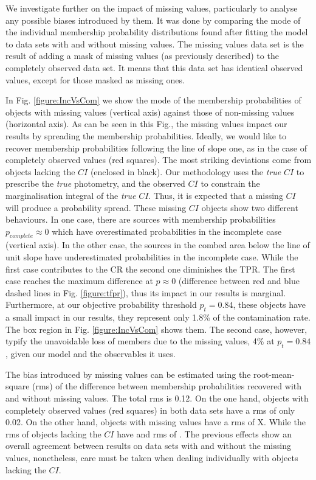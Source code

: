 We investigate further on the impact of missing values, particularly to analyse any possible biases introduced by them. It was done by comparing the mode of the individual membership probability distributions found after fitting the model to data sets with and without missing values. The missing values data set is the result of adding a mask of missing values (as previously described) to the completely observed data set. It means that this data set has identical observed values, except for those masked as missing ones. 

In Fig. \ref{figure:IncVsCom} we show the mode of the membership probabilities of objects with missing values (vertical axis) against those of non-missing values (horizontal axis). As can be seen in this Fig., the missing values impact our results by spreading the membership probabilities. Ideally, we would like to recover membership probabilities following the line of slope one, as in the case of completely observed values (red squares). The most striking deviations come from objects lacking the $CI$ (enclosed in black). Our methodology uses the \emph{true} $CI$ to prescribe the \emph{true} photometry, and the observed $CI$ to constrain the marginalisation integral of the \emph{true} $CI$. Thus, it is expected that a missing $CI$ will produce a probability spread. These missing $CI$ objects show two different behaviours. In one case, there are sources with membership probabilities $p_{complete} \approx0$ which have overestimated probabilities in the incomplete case (vertical axis). In the other case, the sources in the combed area below the line of unit slope have underestimated probabilities in the incomplete case. While the first case contributes to the CR the second one diminishes the TPR. The first case reaches the maximum difference at $p \approx 0$ (difference between red and blue dashed lines in Fig. \ref{figure:tfpr}), thus its impact in our results is marginal. Furthermore, at our objective probability threshold $p_t=0.84$, these objects have a small impact in our results, they represent only 1.8\% of the contamination rate. The box region in Fig. \ref{figure:IncVsCom} shows them. The second case, however, typify the unavoidable loss of members due to the missing values, 4\% at $p_t=0.84$, given our model and the observables it uses.


The bias introduced by missing values can be estimated using the root-mean-square (rms) of the difference between membership probabilities recovered with and without missing values. The total rms is 0.12. On the one hand, objects with completely observed values (red squares) in both data sets have a rms of only 0.02. On the other hand, objects with missing values have a rms of X. While the rms of objects lacking the $CI$ have and rms of .  The previous effects show an overall agreement between results on data sets with and without the missing values, nonetheless, care must be taken when dealing individually with objects lacking the $CI$. 


